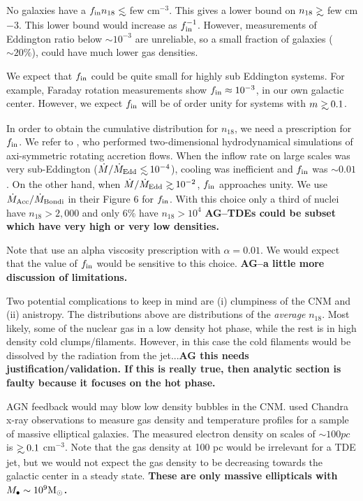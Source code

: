 \documentclass[usenatbib,fleqn]{mnras}
\newcommand\lsim{\mathrel{\rlap{\lower4pt\hbox{\hskip1pt$\sim$}}
    \raise1pt\hbox{$<$}}}
\newcommand\gsim{\mathrel{\rlap{\lower4pt\hbox{\hskip1pt$\sim$}}
    \raise1pt\hbox{$>$}}}
\newcommand{\Mbh}[1][]{M_{\bullet#1}}
\newcommand{\Msun}{{\rm M_\odot}}
\begin{document}
No galaxies have a $f_{\rm in }n_{18} \lsim$ few cm$^{-3}$.  This
gives a lower bound on $n_{18} \gsim$ few cm${-3}$.  This lower bound
would increase as $f_{\rm in}^{-1}$. However, measurements of
Eddington ratio below $\sim 10^{-3}$ are unreliable, so a small
fraction of galaxies ($\sim 20\%$), could have much lower gas
densities.

We expect that $f_{\rm in}$ could be quite small for highly sub
Eddington systems. For example, Faraday rotation measurements
\citep{Quataert+2000} show $f_{\rm in}\approx 10^{-3}$, in our own
galactic center. However, we expect $f_{\rm in}$ will be of order
unity for systems with $m\gsim 0.1$.  

In order to obtain the cumulative distribution for $n_{18}$, we need
a prescription for $f_{\rm in}$. We refer to \citet{Li+2013}, who
performed two-dimensional hydrodynamical simulations of axi-symmetric
rotating accretion flows. When the inflow rate on large scales was
very sub-Eddington ($\dot{M}/\dot{M}_{\rm Edd} \lsim 10^{-4}$),
cooling was inefficient and $f_{\rm in}$ was $\sim 0.01$. On the other
hand, when $\dot{M}/\dot{M}_{\rm Edd}\gsim 10^{-2}$, $f_{\rm in}$
approaches unity.  We use $\dot{M}_{\rm Acc}/\dot{M}_{\rm Bondi}$ in
their Figure 6 for $f_{\rm in}$.  With this choice only a third of
nuclei have $n_{18}>2,000$ and only 6\% have $n_{18}>10^{4}$ {\bf
  AG--TDEs could be subset which have very high or very low densities.}

Note that \citet{Li+2013} use an alpha viscosity prescription with
$\alpha=0.01$. We would expect that the value of $f_{\rm in}$ would be
sensitive to this choice. {\bf AG--a little more discussion of limitations.}

Two potential complications to keep in mind are (i) clumpiness of the
CNM and (ii) anistropy. The distributions above are
distributions of the {\it average} $n_{18}$.  Most likely, some of the
nuclear gas in a low density hot phase, while the rest is in high density
cold clumps/filaments. However, in this case the cold filaments would
be dissolved by the radiation from the jet...{\bf AG this needs
  justification/validation. If this is really true, then analytic
  section is faulty because it focuses on the hot phase.}


AGN feedback would may blow low density bubbles in the
CNM. \citet{Russell+2013} used Chandra x-ray observations to measure gas
density and temperature profiles for a sample of massive elliptical
galaxies. The measured electron density on scales of $\sim 100
pc$ is $\gsim 0.1$ cm$^{-3}$. Note that the gas density at 100 pc
would be irrelevant for a TDE jet, but we would not expect the gas
density to be decreasing towards the galactic center in a steady
state. {\bf These are only massive ellipticals with $\Mbh\sim 10^{9} \Msun$.}
\end{document}
